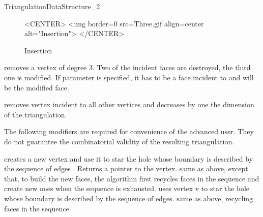 \begin{ccRefConcept}{TriangulationDataStructure_2}
\begin{figure}
\begin{ccTexOnly}
\begin{center}  \end{center}
\caption{Insertion}
\end{ccTexOnly} 

\begin{ccHtmlOnly}
<CENTER>
<img border=0 src=Three.gif align=center alt="Insertion">
</CENTER>
\end{ccHtmlOnly} 
\end{figure}



{removes a vertex of degree 3. Two of the incident faces are destroyed,
the third one is modified.
If parameter   is specified, it has to be a face incident to 
and will be the modified face.
}



\ccGlue
{}
\ccGlue
{}
{removes vertex  incident to all other vertices
and  decreases by one the dimension of the triangulation.
 }


\begin{ccAdvanced}
The following modifiers are required for convenience of the advanced
user.
They do not guarantee the combinatorial validity 
of the resulting triangulation.

{creates a new vertex  and use it to star the hole 
whose boundary is described  by the sequence of edges \ccc{[edge_begin, 
edge_end[}. Returns a pointer to the  vertex.}
\ccGlue 
{}
{ same as above, except that, to build the new faces, the  algorithm 
first recycles faces in the sequence \ccc{[face_begin, 
face_end[} and create new ones when the sequence is exhausted.}
\ccGlue
{}
{uses vertex v to  star the hole 
whose boundary is described  by the sequence of edges\ccc{[edge_begin, 
edge_end[}.
}
\ccGlue
{}
{same as above, recycling faces in the sequence  \ccc{[face_begin, 
face_end[ . } }


\end{ccAdvanced}
\end{ccRefConcept}
